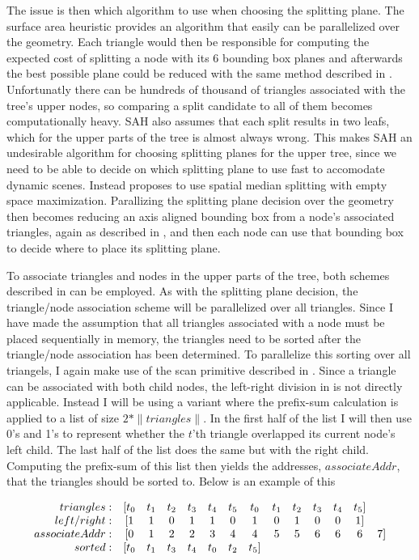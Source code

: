 The issue is then which algorithm to use when choosing the splitting plane. The
surface area heuristic provides an algorithm that easily can be parallelized
over the geometry. Each triangle would then be responsible for computing the
expected cost of splitting a node with its 6 bounding box planes and afterwards
the best possible plane could be reduced with the same method described in
. Unfortunatly there can be hundreds of thousand of
triangles associated with the tree's upper nodes, so comparing a split candidate
to all of them becomes computationally heavy. SAH also assumes that each split
results in two leafs, which for the upper parts of the tree is almost always
wrong. This makes SAH an undesirable algorithm for choosing splitting planes for
the upper tree, since we need to be able to decide on which splitting plane to
use fast to accomodate dynamic scenes. Instead \zhou{} proposes to use spatial
median splitting with empty space maximization. Parallizing the splitting plane
decision over the geometry then becomes reducing an axis aligned bounding box
from a node's associated triangles, again as described in
, and then each node can use that bounding box to decide
where to place its splitting plane.

To associate triangles and nodes in the upper parts of the tree, both schemes
described in  can be employed. As with the
splitting plane decision, the triangle/node association scheme will be
parallelized over all triangles. Since I have made the assumption that all
triangles associated with a node must be placed sequentially in memory, the
triangles need to be sorted after the triangle/node association has been
determined. To parallelize this sorting over all triangels, I again make use of
the scan primitive described in . Since a triangle can
be associated with both child nodes, the left-right division in
 is not directly applicable. Instead I will be using a
variant where the prefix-sum calculation is applied to a list of size $2 *
\|triangles\|$. In the first half of the list I will then use 0's and 1's to
represent whether the $t$'th triangle overlapped its current node's left
child. The last half of the list does the same but with the right
child. Computing the prefix-sum of this list then yields the addresses,
$associateAddr$, that the triangles should be sorted to. Below is an example of
this

\begin{displaymath}
  \begin{array}{r c c c c c c c c c c c c c}
    triangles: & [t_0 & t_1 & t_2 & t_3 & t_4 & t_5 & t_0 & t_1 & t_2 & t_3 & t_4 & t_5]\\
    left/right: & [1 & 1 & 0 & 1 & 1 & 0 & 1 & 0 & 1 & 0 & 0 & 1]\\
    associateAddr: & [0 & 1 & 2 & 2 & 3 & 4 & 4 & 5 & 5 & 6 & 6 & 6 & 7]\\
    sorted: & [t_0 & t_1 & t_3 & t_4 & t_0 & t_2 & t_5]
  \end{array}
\end{displaymath}

